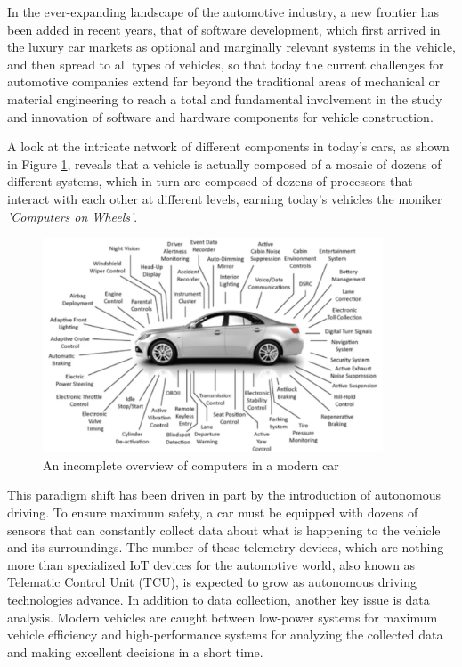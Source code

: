 In the ever-expanding landscape of the automotive industry, a new frontier has been added in recent years, that of software development, which first arrived in the luxury car markets as optional and marginally relevant systems in the vehicle, and then spread to all types of vehicles, so that today the current challenges for automotive companies extend far beyond the traditional areas of mechanical or material engineering to reach a total and fundamental involvement in the study and innovation of software and hardware components for vehicle construction. 

A look at the intricate network of different components in today's cars, as shown in Figure \ref{fig:VheicleProcessors}, reveals that a vehicle is actually composed of a mosaic of dozens of different systems, which in turn are composed of dozens of processors that interact with each other at different levels, earning today's vehicles the moniker \textit{'Computers on Wheels'}.
\begin{figure}[h]  %
  \centering
  \includegraphics[width=0.9\textwidth]{images/vehicle_processors.png}  %
  \caption{An incomplete overview of computers in a modern car \cite{ieeeSoftwareDefinedVehicle}}
  \label{fig:VheicleProcessors}
\end{figure}

This paradigm shift has been driven in part by the introduction of autonomous driving. To ensure maximum safety, a car must be equipped with dozens of sensors that can constantly collect data about what is happening to the vehicle and its surroundings. The number of these telemetry devices, which are nothing more than specialized IoT devices for the automotive world, also known as Telematic Control Unit (TCU), is expected to grow as autonomous driving technologies advance. In addition to data collection, another key issue is data analysis. Modern vehicles are caught between low-power systems for maximum vehicle efficiency and high-performance systems for analyzing the collected data and making excellent decisions in a short time.

